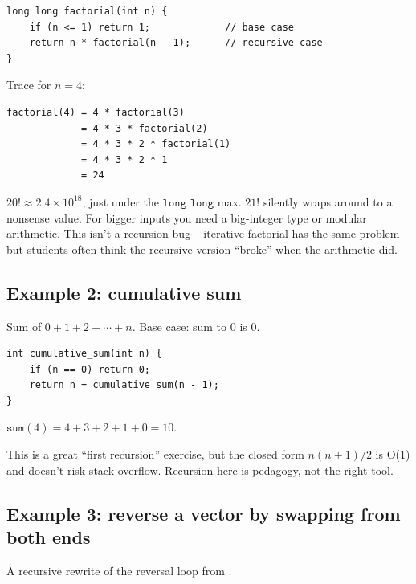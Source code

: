\documentclass[11pt]{article}
\begin{document}
\begin{examplebox}[Factorial in C++]
\begin{verbatim}
long long factorial(int n) {
    if (n <= 1) return 1;             // base case
    return n * factorial(n - 1);      // recursive case
}
\end{verbatim}
Trace for $n = 4$:
\begin{verbatim}
factorial(4) = 4 * factorial(3)
             = 4 * 3 * factorial(2)
             = 4 * 3 * 2 * factorial(1)
             = 4 * 3 * 2 * 1
             = 24
\end{verbatim}
\end{examplebox}

\begin{warnbox}[\texttt{n!} overflows 64-bit \texttt{long long} at $n = 21$]
$20! \approx 2.4 \times 10^{18}$, just under the $\texttt{long long}$
max. $21!$ silently wraps around to a nonsense value. For bigger
inputs you need a big-integer type or modular arithmetic. This isn't
a recursion bug -- iterative factorial has the same problem -- but
students often think the recursive version ``broke'' when the
arithmetic did.
\end{warnbox}

\subsection{Example 2: cumulative sum}

Sum of $0 + 1 + 2 + \cdots + n$. Base case: sum to $0$ is $0$.

\begin{examplebox}
\begin{verbatim}
int cumulative_sum(int n) {
    if (n == 0) return 0;
    return n + cumulative_sum(n - 1);
}
\end{verbatim}
$\texttt{sum}(4) = 4 + 3 + 2 + 1 + 0 = 10$.

This is a great ``first recursion'' exercise, but the closed form
$n(n+1)/2$ is O(1) and doesn't risk stack overflow. Recursion here is
pedagogy, not the right tool.
\end{examplebox}

\subsection{Example 3: reverse a vector by swapping from both ends}

A recursive rewrite of the reversal loop from .
\end{document}
